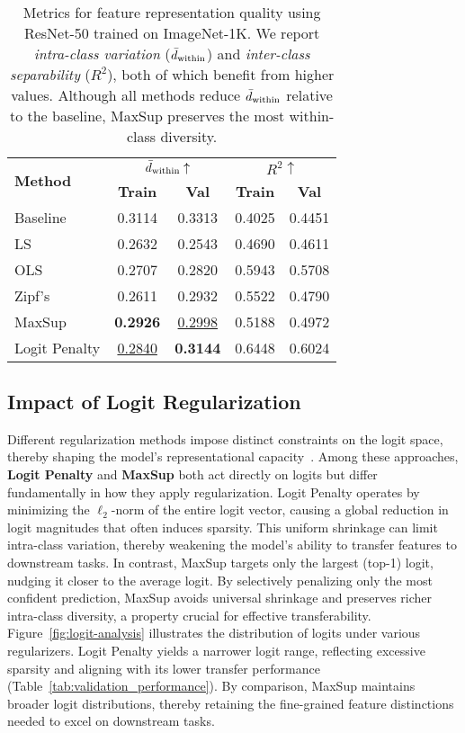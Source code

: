 \begin{table}[t]
\setlength{\tabcolsep}{6pt}
\renewcommand{\arraystretch}{1.2}
\centering
\scriptsize
\caption{Metrics for feature representation quality using ResNet-50 trained on ImageNet-1K. 
We report \emph{intra-class variation} ($\Bar{d}_\text{within}$) and \emph{inter-class separability} ($R^2$), both of which benefit from higher values. 
Although all methods reduce $\Bar{d}_\text{within}$ relative to the baseline, MaxSup preserves the most within-class diversity.}
\label{tab:feature}
\begin{tabular}{@{}l|cc|cc@{}}
\toprule
\multirow{2}{*}{\textbf{Method}} 
& \multicolumn{2}{c|}{$\Bar{d}_\text{within} \uparrow$} 
& \multicolumn{2}{c}{$R^2 \uparrow$} \\
\cmidrule{2-5}
& \textbf{Train} & \textbf{Val} & \textbf{Train} & \textbf{Val} \\
\midrule
Baseline & 0.3114 & 0.3313 & 0.4025 & 0.4451 \\
\hline
LS       & 0.2632 & 0.2543 & 0.4690 & 0.4611 \\
OLS      & 0.2707 & 0.2820 & 0.5943 & 0.5708 \\
Zipf's   & 0.2611 & 0.2932 & 0.5522 & 0.4790 \\
MaxSup   & \textbf{0.2926} & \underline{0.2998} & 0.5188 & 0.4972 \\
Logit Penalty & \underline{0.2840} & \textbf{0.3144} & 0.6448 & 0.6024 \\
\bottomrule
\end{tabular}
\end{table}



\subsection{Impact of Logit Regularization}
Different regularization methods impose distinct constraints on the logit space, thereby shaping the model’s representational capacity~\citep{kornblith2021better}. Among these approaches, \textbf{Logit Penalty} and \textbf{MaxSup} both act directly on logits but differ fundamentally in how they apply regularization.
Logit Penalty operates by minimizing the $\ell_2$-norm of the entire logit vector, causing a global reduction in logit magnitudes that often induces sparsity. This uniform shrinkage can limit intra-class variation, thereby weakening the model’s ability to transfer features to downstream tasks. In contrast, MaxSup targets only the largest (top-1) logit, nudging it closer to the average logit. By selectively penalizing only the most confident prediction, MaxSup avoids universal shrinkage and preserves richer intra-class diversity, a property crucial for effective transferability.
Figure~\ref{fig:logit-analysis} illustrates the distribution of logits under various regularizers. Logit Penalty yields a narrower logit range, reflecting excessive sparsity and aligning with its lower transfer performance (Table~\ref{tab:validation_performance}). By comparison, MaxSup maintains broader logit distributions, thereby retaining the fine-grained feature distinctions needed to excel on downstream tasks.




